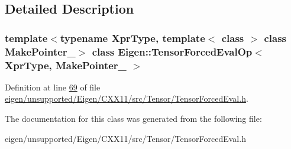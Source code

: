 \subsection{Detailed Description}
\subsubsection*{template$<$typename Xpr\+Type, template$<$ class $>$ class Make\+Pointer\+\_\+$>$\newline
class Eigen\+::\+Tensor\+Forced\+Eval\+Op$<$ Xpr\+Type, Make\+Pointer\+\_\+ $>$}



Definition at line \hyperlink{eigen_2unsupported_2_eigen_2_c_x_x11_2src_2_tensor_2_tensor_forced_eval_8h_source_l00069}{69} of file \hyperlink{eigen_2unsupported_2_eigen_2_c_x_x11_2src_2_tensor_2_tensor_forced_eval_8h_source}{eigen/unsupported/\+Eigen/\+C\+X\+X11/src/\+Tensor/\+Tensor\+Forced\+Eval.\+h}.



The documentation for this class was generated from the following file\+:\begin{DoxyCompactItemize}
\item 
eigen/unsupported/\+Eigen/\+C\+X\+X11/src/\+Tensor/\+Tensor\+Forced\+Eval.\+h\end{DoxyCompactItemize}
